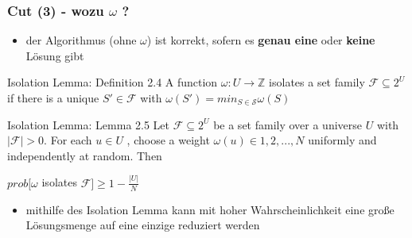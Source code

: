 \documentclass{beamer}
\begin{document}
\begin{frame}
\frametitle{Cut (3) - wozu $\omega$ ?}
\begin{itemize}
\pause
\item der Algorithmus (ohne $\omega$) ist korrekt, sofern es \textbf{genau eine} oder \textbf{keine} Lösung gibt
\end{itemize}
\pause
\begin{block}{Isolation Lemma: Definition 2.4}
A function $\omega : U \rightarrow \mathbb{Z}$ isolates a set family $\mathcal{F} \subseteq 2^U$ if there is a unique $S' \in \mathcal{F}$ with $\omega (S')=min_{S \in \mathcal{S}} \omega(S)$
\end{block}
\pause
\begin{block}{Isolation Lemma: Lemma 2.5}
Let $\mathcal{F} \subseteq 2^U$ be a set family over a universe $U$ with $|\mathcal{F}| > 0$. For each $u \in U$ ,
choose a weight $\omega(u) \in {1, 2, . . . , N }$ uniformly and independently at random. Then
\begin{center}
$prob[\omega$ isolates $\mathcal{F}]\geq 1 - \frac{|U|}{N}$
\end{center}
\end{block}
\begin{itemize}
\pause
\item mithilfe des Isolation Lemma kann mit hoher Wahrscheinlichkeit eine große Lösungsmenge auf eine einzige reduziert werden
\end{itemize}

\end{frame}
\end{document}
